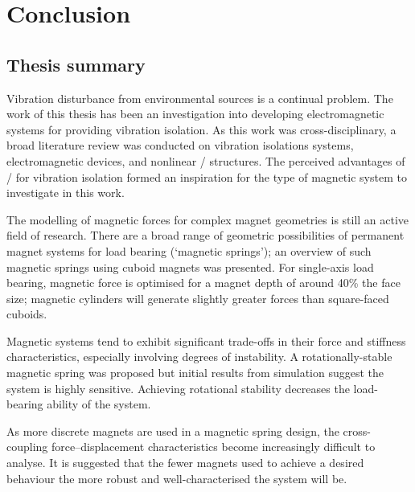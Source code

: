 \documentclass[10pt,a4paper]{memoir}
\begin{document}
\chapter{Conclusion}

\section{Thesis summary}

Vibration disturbance from environmental sources is a continual problem.
The work of this thesis has been an investigation into developing electromagnetic systems for providing vibration isolation.
As this work was cross-disciplinary, a broad literature review was conducted on vibration isolations systems, electromagnetic devices, and nonlinear \qzs/ structures.
The perceived advantages of \qzs/ for vibration isolation formed an inspiration for the type of magnetic system to investigate in this work.

The modelling of magnetic forces for complex magnet geometries is still an active field of research.
There are a broad range of geometric possibilities of permanent magnet systems for load bearing (`magnetic springs'); an overview of such magnetic springs using cuboid magnets was presented.
For single-axis load bearing, magnetic force is optimised for a magnet depth of around 40\% the face size; magnetic cylinders will generate slightly greater forces than square-faced cuboids.

Magnetic systems tend to exhibit significant trade-offs in their force and stiffness characteristics, especially involving degrees of instability.
A rotationally-stable magnetic spring was proposed but initial results from simulation suggest the system is highly sensitive.
Achieving rotational stability decreases the load-bearing ability of the system.

As more discrete magnets are used in a magnetic spring design, the cross-coupling force--displacement characteristics become increasingly difficult to analyse.
It is suggested that the fewer magnets used to achieve a desired behaviour the more robust and well-characterised the system will be.
\end{document}
